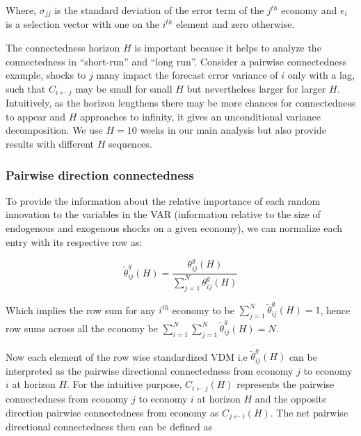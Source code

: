 \documentclass[]{elsarticle} %
\begin{document}
Where, \({{\sigma }_{jj}}\) is the standard deviation of the error term
of the \({{j}^{th}}\) economy and \({{e}_{i}}\) is a selection vector
with one on the \({{i}^{th}}\) element and zero otherwise.

The connectedness horizon \(H\) is important because it helps to analyze
the connectedness in ``short-run'' and ``long run''. Consider a pairwise
connectedness example, shocks to \(j\) many impact the forecast error
variance of \(i\) only with a lag, such that \({{C}_{i\leftarrow j}}\)
may be small for small \(H\) but nevertheless larger for larger \(H\).
Intuitively, as the horizon lengthens there may be more chances for
connectedness to appear and \(H\) approaches to infinity, it gives an
unconditional variance decomposition. We use \(H=10\) weeks in our main
analysis but also provide results with different \(H\) sequences.

\subsubsection{\texorpdfstring{\textbf{Pairwise direction
connectedness}}{Pairwise direction connectedness}}\label{pairwise-direction-connectedness}

To provide the information about the relative importance of each random
innovation to the variables in the VAR (information relative to the size
of endogenous and exogenous shocks on a given economy), we can normalize
each entry with its respective row as:

\[\tilde{\theta }_{ij}^{g}\left( H \right)=\frac{\theta _{ij}^{g}\left( H \right)}{\sum\nolimits_{j=1}^{N}{\theta _{ij}^{g}\left( H \right)}}\]

Which implies the row sum for any \({{i}^{th}}\) economy to be
\(\sum\nolimits_{j=1}^{N}{\tilde{\theta }_{ij}^{g}\left( H \right)}=1\),
hence row sums across all the economy be
\(\sum\nolimits_{i=1}^{N}{\sum\nolimits_{j=1}^{N}{\tilde{\theta }_{ij}^{g}\left( H \right)}}=N\).

Now each element of the row wise standardized VDM i.e
\({\tilde \theta _{ij}^g\left( H \right)}\) can be interpreted as the
pairwise directional connectedness from economy \(j\) to economy \(i\)
at horizon \(H\). For the intuitive purpose,
\({{C}_{i\leftarrow j}}\left( H \right)\) represents the pairwise
connectedness from economy \(j\) to economy \(i\) at horizon \(H\) and
the opposite direction pairwise connectedness from economy as
\({{C}_{j\leftarrow i}}\left( H \right)\). The net pairwise directional
connectedness then can be defined as
\end{document}
